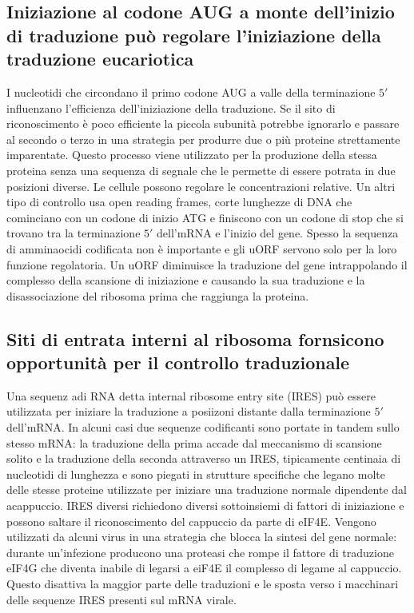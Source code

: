 \subsection{Iniziazione al codone AUG a monte dell'inizio di traduzione pu\`o regolare l'iniziazione della traduzione eucariotica}
I nucleotidi che circondano il primo codone AUG a valle della terminazione $5'$ influenzano l'efficienza dell'iniziazione della traduzione. Se il sito di riconoscimento \`e poco 
efficiente la piccola subunit\`a potrebbe ignorarlo e passare al secondo o terzo in una strategia per produrre due o pi\`u proteine strettamente imparentate. Questo processo viene 
utilizzato per la produzione della stessa proteina senza una sequenza di segnale che le permette di essere potrata in due posizioni diverse. Le cellule possono regolare le concentrazioni
relative. Un altri tipo di controllo usa open reading frames, corte lunghezze di DNA che cominciano con un codone di inizio ATG e finiscono con un codone di stop che si trovano tra
la terminazione $5'$ dell'mRNA e l'inizio del gene. Spesso la sequenza di amminaocidi codificata non \`e importante e gli uORF servono solo per la loro funzione regolatoria. Un uORF 
diminuisce la traduzione del gene intrappolando il complesso della scansione di iniziazione e causando la sua traduzione e la disassociazione del ribosoma prima che raggiunga la 
proteina.
\subsection{Siti di entrata interni al ribosoma fornsicono opportunit\`a per il controllo traduzionale}
Una sequenz adi RNA detta internal ribosome entry site (IRES) pu\`o essere utilizzata per iniziare la traduzione a posiizoni distante dalla terminazione $5'$ dell'mRNA. In alcuni casi
due sequenze codificanti sono portate in tandem sullo stesso mRNA: la traduzione della prima accade dal meccanismo di scansione solito e la traduzione della seconda attraverso un IRES, 
tipicamente centinaia di nucleotidi di lunghezza e sono piegati in strutture specifiche che legano molte delle stesse proteine utilizzate per iniziare una traduzione normale dipendente
dal acappuccio. IRES diversi richiedono diversi sottoinsiemi di fattori di iniziazione e possono saltare il riconoscimento del cappuccio da parte di eIF4E. Vengono utilizzati da 
alcuni virus in una strategia che blocca la sintesi del gene normale: durante un'infezione producono una proteasi che rompe il fattore di traduzione eIF4G che diventa inabile di 
legarsi a eiF4E il complesso di legame al cappuccio. Questo disattiva la maggior parte delle traduzioni e le sposta verso i macchinari delle sequenze IRES presenti sul mRNA virale. 
